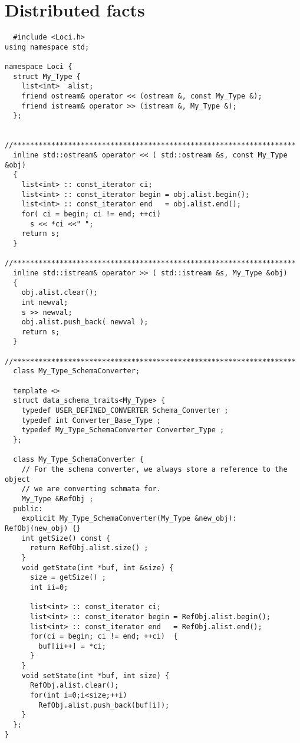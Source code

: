 \section {Distributed facts }
\begin{verbatim} 
  #include <Loci.h>
using namespace std;

namespace Loci {
  struct My_Type {
    list<int>  alist;
    friend ostream& operator << (ostream &, const My_Type &);
    friend istream& operator >> (istream &, My_Type &);
  };
  
  //*******************************************************************
  inline std::ostream& operator << ( std::ostream &s, const My_Type &obj)
  {
    list<int> :: const_iterator ci;
    list<int> :: const_iterator begin = obj.alist.begin();
    list<int> :: const_iterator end   = obj.alist.end();
    for( ci = begin; ci != end; ++ci)
      s << *ci <<" ";
    return s;
  }
  //*******************************************************************
  inline std::istream& operator >> ( std::istream &s, My_Type &obj)
  {
    obj.alist.clear();
    int newval;
    s >> newval;
    obj.alist.push_back( newval );
    return s;
  }
  //*******************************************************************
  class My_Type_SchemaConverter;
  
  template <>
  struct data_schema_traits<My_Type> {
    typedef USER_DEFINED_CONVERTER Schema_Converter ;
    typedef int Converter_Base_Type ;
    typedef My_Type_SchemaConverter Converter_Type ;
  };
  
  class My_Type_SchemaConverter {
    // For the schema converter, we always store a reference to the object
    // we are converting schmata for.
    My_Type &RefObj ;
  public:
    explicit My_Type_SchemaConverter(My_Type &new_obj): RefObj(new_obj) {}
    int getSize() const {
      return RefObj.alist.size() ;
    }
    void getState(int *buf, int &size) {
      size = getSize() ;
      int ii=0;
      
      list<int> :: const_iterator ci;
      list<int> :: const_iterator begin = RefObj.alist.begin();
      list<int> :: const_iterator end   = RefObj.alist.end();
      for(ci = begin; ci != end; ++ci)  {
        buf[ii++] = *ci;
      }
    }
    void setState(int *buf, int size) {
      RefObj.alist.clear();
      for(int i=0;i<size;++i)
        RefObj.alist.push_back(buf[i]);
    }
  };
}


\end{verbatim}
